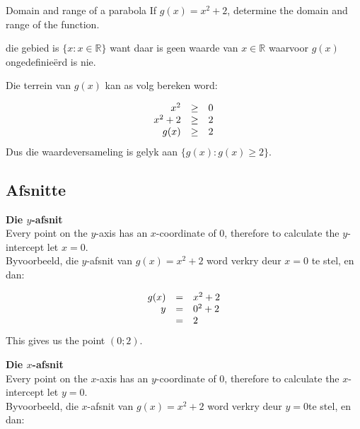 \begin{wex}{Domain and range of a parabola}
{If $g(x)={x}^{2}+2$, determine the domain and range of the function.}
{
die gebied is $\{x:x\in \mathbb{R}\}$ want daar is geen waarde van $x\in \mathbb{R}$ waarvoor $g(x)$ ongedefinieërd is nie.

Die terrein van $g(x)$ kan as volg bereken word:

\begin{equation*}
\begin{array}{ccc}\hfill {x}^{2}& \ge & 0\hfill \\
 \hfill {x}^{2}+2& \ge & 2\hfill \\
 \hfill g(x)& \ge & 2\hfill 
\end{array}
\end{equation*}
Dus die waardeversameling is gelyk aan $\{g(x):g(x)\geq 2\}$.
}
\end{wex}



\subsection*{Afsnitte}
\textbf{Die $y$-afsnit}\\
Every point on the $y$-axis has an $x$-coordinate of $0$, therefore to calculate the $y$-intercept let $x=0$.\\

Byvoorbeeld, die $y$-afsnit van $g(x)={x}^{2}+2$ word verkry deur $x=0$ te stel, en dan:\par 

\begin{equation*}
\begin{array}{ccl}\hfill g(x)& =& {x}^{2}+2\hfill \\ 
\hfill {y}& =& {0}^{2}+2\hfill \\
 & =& 2\hfill 
\end{array}
\end{equation*}
This gives us the point $(0;2)$.\par

\textbf{Die $x$-afsnit}\\
Every point on the $x$-axis has an $y$-coordinate of $0$, therefore to calculate the $x$-intercept let $y=0$.\\

Byvoorbeeld, die $x$-afsnit van $g(x)={x}^{2}+2$ word verkry deur $y=0$te stel, en dan:\par

